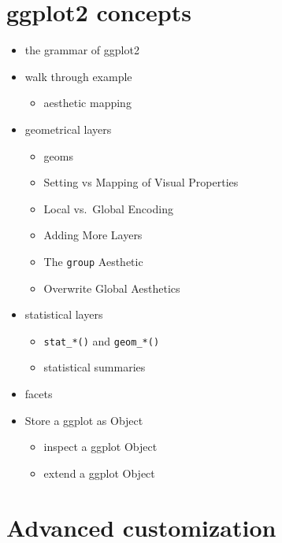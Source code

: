 \documentclass[
]{book}
\providecommand{\tightlist}{%
  \setlength{\itemsep}{0pt}\setlength{\parskip}{0pt}}
\begin{document}
\hypertarget{ggplot2-concepts-1}{%
\section{ggplot2 concepts}\label{ggplot2-concepts-1}}

\begin{itemize}
\tightlist
\item
  the grammar of ggplot2
\item
  walk through example

  \begin{itemize}
  \tightlist
  \item
    aesthetic mapping
  \end{itemize}
\item
  geometrical layers

  \begin{itemize}
  \tightlist
  \item
    geoms
  \item
    Setting vs Mapping of Visual Properties
  \item
    Local vs.~Global Encoding
  \item
    Adding More Layers
  \item
    The \texttt{group} Aesthetic
  \item
    Overwrite Global Aesthetics
  \end{itemize}
\item
  statistical layers

  \begin{itemize}
  \tightlist
  \item
    \texttt{stat\_*()} and \texttt{geom\_*()}
  \item
    statistical summaries
  \end{itemize}
\item
  facets
\item
  Store a ggplot as Object

  \begin{itemize}
  \tightlist
  \item
    inspect a ggplot Object
  \item
    extend a ggplot Object
  \end{itemize}
\end{itemize}

\hypertarget{advanced-customization-1}{%
\section{Advanced customization}\label{advanced-customization-1}}
\end{document}
